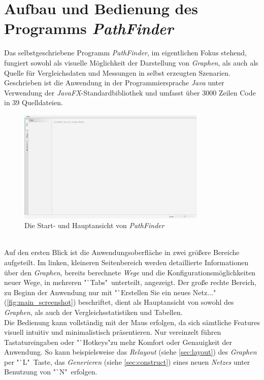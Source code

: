 \documentclass[12pt]{article}
\begin{document}
\section{Aufbau und Bedienung des Programms \textit{PathFinder}}
\label{sec:manual}
Das selbstgeschriebene Programm \textit{PathFinder}, im eigentlichen Fokus stehend, fungiert sowohl als visuelle Möglichkeit der Darstellung von \textit{Graphen}, als auch als Quelle für Vergleichsdaten und Messungen in selbst erzeugten Szenarien. 
\\
Geschrieben ist die Anwendung in der Programmiersprache \textit{Java} unter Verwendung der \textit{JavaFX}-Standardbibliothek \cite{javafx} und umfasst über 3000 Zeilen Code in 39 Quelldateien.
\begin{figure}[h!]
\includegraphics[width=0.8\textwidth]{res/main_screenshot.png}
\centering
\caption{Die Start- und Hauptansicht von \textit{PathFinder}}
\label{fig:main_screenshot}
\end{figure}
\\
Auf den ersten Blick ist die Anwendungsoberfläche in zwei größere Bereiche aufgeteilt. Im linken, kleineren Seitenbereich werden detaillierte Informationen über den \textit{Graphen}, bereits berechnete \textit{Wege} und die Konfigurationsmöglichkeiten neuer Wege, in mehreren "`Tabs"\ unterteilt, angezeigt. Der große rechte Bereich, zu Beginn der Anwendung nur mit "`Erstellen Sie ein neues Netz..." (\autoref{fig:main_screenshot}) beschriftet, dient als Hauptansicht von sowohl des \textit{Graphen}, als auch der Vergleichsstatistiken und Tabellen.
\\
Die Bedienung kann vollständig mit der Maus erfolgen, da sich sämtliche Features visuell intuitiv und minimalistisch präsentieren. Nur vereinzelt führen Tastatureingaben oder "`Hotkeys"\;zu mehr Komfort oder Genauigkeit der Anwendung. So kann beispielsweise das \textit{Relayout} (siehe \autoref{sec:layout}) des \textit{Graphen} per "`L"\ Taste, das \textit{Generieren} (siehe \autoref{sec:construct}) eines neuen \textit{Netzes} unter Benutzung von "`N"\ erfolgen.
\clearpage
\end{document}
